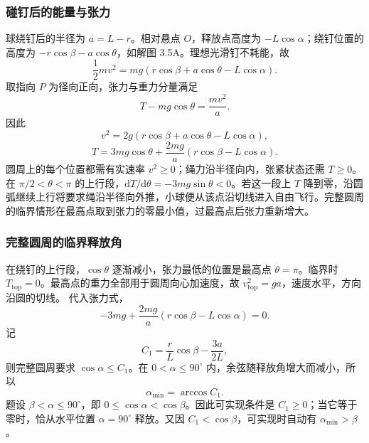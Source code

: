 \documentclass[UTF8,fontset=fandol,a4paper,11pt]{ctexart}
\begin{document}
\subsubsection*{碰钉后的能量与张力}
球绕钉后的半径为 $a=L-r$。相对悬点 $O$，释放点高度为 $-L\cos\alpha$；绕钉位置的高度为 $-r\cos\beta-a\cos\theta$，如解图 3.5A。理想光滑钉不耗能，故
\[
\frac12mv^2=mg(r\cos\beta+a\cos\theta-L\cos\alpha).
\]
取指向 $P$ 为径向正向，张力与重力分量满足
\[
T-mg\cos\theta=\frac{mv^2}{a}.
\]
因此
\[
v^2=2g(r\cos\beta+a\cos\theta-L\cos\alpha),
\]
\[
T=3mg\cos\theta+\frac{2mg}{a}(r\cos\beta-L\cos\alpha).
\]
圆周上的每个位置都需有实速率 $v^2\geq0$；绳力沿半径向内，张紧状态还需 $T\geq0$。在 $\pi/2<\theta<\pi$ 的上行段，$\mathrm dT/\mathrm d\theta=-3mg\sin\theta<0$。若这一段上 $T$ 降到零，沿圆弧继续上行将要求绳沿半径向外推，小球便从该点沿切线进入自由飞行。完整圆周的临界情形在最高点取到张力的零最小值，过最高点后张力重新增大。

\subsubsection*{完整圆周的临界释放角}
在绕钉的上行段，$\cos\theta$ 逐渐减小，张力最低的位置是最高点 $\theta=\pi$。临界时 $T_{\mathrm{top}}=0$。最高点的重力全部用于圆周向心加速度，故 $v_{\mathrm{top}}^2=ga$，速度水平，方向沿圆的切线。
代入张力式，
\[
-3mg+\frac{2mg}{a}(r\cos\beta-L\cos\alpha)=0.
\]
记
\[
C_1=\frac rL\cos\beta-\frac{3a}{2L},
\]
则完整圆周要求 $\cos\alpha\leq C_1$。在 $0<\alpha\leq90^\circ$ 内，余弦随释放角增大而减小，所以
\[
\boxed{\alpha_{\min}=\arccos C_1}.
\]
题设 $\beta<\alpha\leq90^\circ$，即 $0\leq\cos\alpha<\cos\beta$。因此可实现条件是 $C_1\geq0$；当它等于零时，恰从水平位置 $\alpha=90^\circ$ 释放。又因 $C_1<\cos\beta$，可实现时自动有 $\alpha_{\min}>\beta$。
\end{document}
